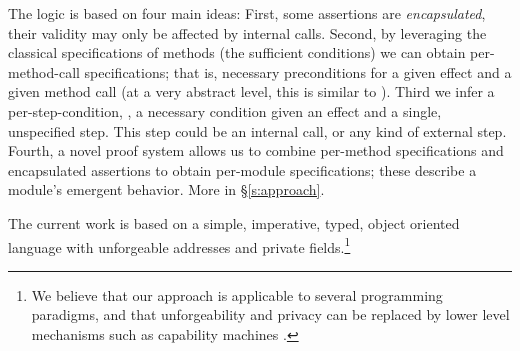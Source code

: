 

 
The \Nec logic is based on four main ideas: 
First, some assertions are \emph{encapsulated}, \ie
their validity may only be affected by internal calls. 
Second, by leveraging the classical  specifications of methods 
(\ie the sufficient conditions) we can obtain per-method-call
 \Nec specifications; that is, necessary preconditions
  for a given effect and a given method call (at a very abstract level, this is
similar to ).
Third we infer a per-step-condition, \ie, a necessary condition given an effect and a single, unspecified step. This step could be an internal call, or any kind of external step.
Fourth,  a novel proof system allows us to combine 
per-method \Nec specifications and encapsulated assertions 
 to obtain per-module   \Nec specifications; these describe a module's
 emergent behavior.
More in \S\ref{s:approach}.
 
 
  The current work is based on a simple, imperative, typed, object oriented
language with unforgeable addresses and private fields.\footnote{We believe
 that our approach is applicable to several programming paradigms, and 
 that   unforgeability and privacy
 can be replaced 
 by lower level mechanisms such as capability machines \cite{vanproving,davis2019cheriabi}.
}


